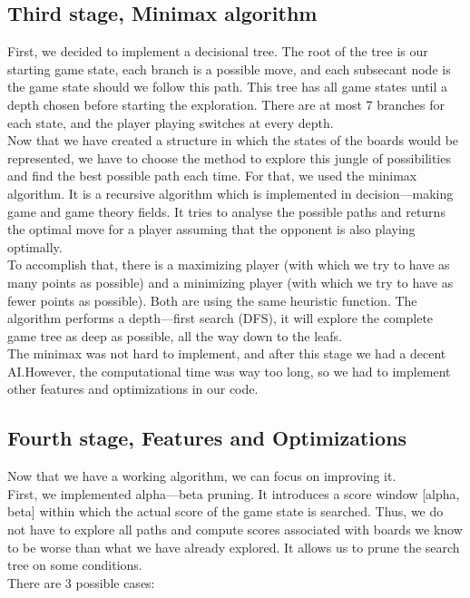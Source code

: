 \documentclass[11pt, a4paper, oneside]{report}
\begin{document}
	\subsection{Third stage, Minimax algorithm}

	First, we decided to implement a decisional tree. The root of the tree is our starting game state, each branch is a possible move, and each subsecant node is the game state should we follow this path. This tree has all game states until a depth chosen before starting the exploration. There are at most 7 branches for each state, and the player playing switches at every depth. \\

	Now that we have created a structure in which the states of the boards would be represented, we have to choose the method to explore this jungle of possibilities and find the best possible path each time. For that, we used the minimax algorithm. It is a recursive algorithm which is implemented in decision—making game and game theory fields. It tries to analyse the possible paths and returns the optimal move for a player assuming that the opponent is also playing optimally. \\

	To accomplish that, there is a maximizing player (with which we try to have as many points as possible) and a minimizing player (with which we try to have as fewer points as possible). Both are using the same heuristic function. The algorithm performs a depth—first search (DFS), it will explore the complete game tree as deep as possible, all the way down to the leafs. \\
	The minimax was not hard to implement, and after this stage we had a decent AI.\@ However, the computational time was way too long, so we had to implement other features and optimizations in our code. \\

	\subsection{Fourth stage, Features and Optimizations}
	Now that we have a working algorithm, we can focus on improving it. \\

	First, we implemented alpha—beta pruning. It introduces a score window [alpha, beta] within which the actual score of the game state is searched. Thus, we do not have to explore all paths and compute scores associated with boards we know to be worse than what we have already explored. It allows us to prune the search tree on some conditions. \\
	There are 3 possible cases:
\end{document}

